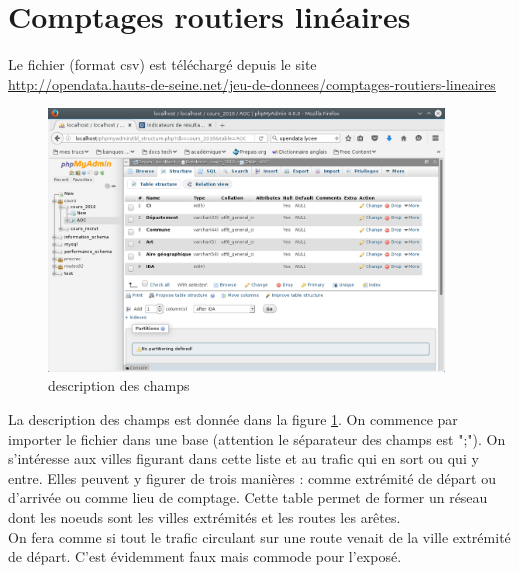 


\section{Comptages routiers linéaires}
Le fichier (format csv) est téléchargé depuis le site\\ \href{http://opendata.hauts-de-seine.net/jeu-de-donnees/comptages-routiers-lineaires}{http://opendata.hauts-de-seine.net/jeu-de-donnees/comptages-routiers-lineaires}\\
\begin{figure}[h]
  \centering
  \includegraphics[width=10.5cm]{./projbdd_1.png}
  \caption{description des champs}
  \label{fig:projbdd_1}
\end{figure}
La description des champs est donnée dans la figure \ref{fig:projbdd_1}. On commence par importer le fichier dans une base (attention le séparateur des champs est ";").
On s'intéresse aux villes figurant dans cette liste et au trafic qui en sort ou qui y entre. Elles peuvent y figurer de trois manières : comme extrémité de départ ou d'arrivée ou comme lieu de comptage. Cette table permet de former un réseau dont les noeuds sont les villes extrémités et les routes les arêtes.\\
On fera comme si tout le trafic circulant sur une route venait de la ville extrémité de départ. C'est évidemment faux mais commode pour l'exposé.
